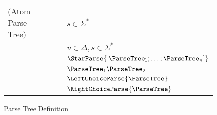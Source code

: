 \begin{figure}
\centering
\begin{tabular}{l@{\ }l@{\ }c@{\ }l}

(Atom Parse Tree)& \ParseTree{} & \GEq{} & $s \in \Sigma^*$ \\
& & & \GBar{} $u \in \Delta,s\in \Sigma^*$\\
& & & \GBar{} $\StarParse{[\ParseTree_1;\ldots;\ParseTree_n]}$ \\
& & & \GBar{} $\ParseTree_1 \ParseTree_2$ \\
& & & \GBar{} $\LeftChoiceParse{\ParseTree}$ \\
& & & \GBar{} $\RightChoiceParse{\ParseTree}$ \\
\end{tabular}
\caption{Parse Tree Definition}
\label{fig:parsetree-definition}
\end{figure}
